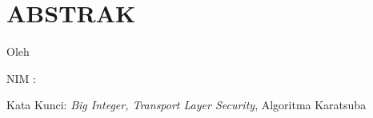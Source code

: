 \clearpage
\chapter*{ABSTRAK}

\begin{center}
  \Large \bfseries \MakeUppercase{\thetitle}

  \normalsize \normalfont Oleh

  \theauthor

  NIM : \thestudentnumber
\end{center}


\begin{singlespacing}

\Blindtext

\end{singlespacing}


Kata Kunci: \textit{Big Integer, Transport Layer Security}, Algoritma Karatsuba
